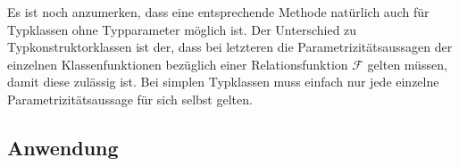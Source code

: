 Es ist noch anzumerken, dass eine entsprechende Methode natürlich auch für Typ\-klas\-sen ohne Typparameter möglich ist. Der
Unterschied zu Typkonstruktorklassen ist der, dass bei letzteren die Parametrizitätsaussagen der einzelnen Klassenfunktionen
bezüglich einer Relationsfunktion $\mathcal{F}$ gelten müssen, damit diese zulässig ist.
Bei simplen Typklassen muss einfach nur jede einzelne Parametrizitätsaussage für sich selbst gelten.





\subsection{Anwendung}

\label{sec:freie-theoreme-anwendung}



